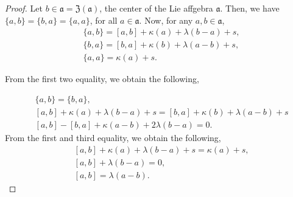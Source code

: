 \documentclass[10pt,a4paper]{amsart}
\begin{document}
\begin{proof}
    Let $b\in \mathfrak{a} = \mathfrak{Z(a)}$, the center of the Lie affgebra $\mathfrak{a}$. Then, we have $\{a, b\}=\{b,a\}=\{a, a\}$, for all $a\in \mathfrak{a}$. Now, for any $a, b\in \mathfrak{a}$,
    \begin{align*}
        &\{a,b\}=[a, b]+\kappa(a)+\lambda(b-a)+s,\\
         &\{b,a\}=[b, a]+\kappa(b)+\lambda(a-b)+s,\\
         &\{a,a\}=\kappa(a)+s.
    \end{align*}
    
From the first two equality, we obtain the following,

\begin{align}
&\{a, b\}=\{b,a\},\nonumber\\
&[a, b]+\kappa(a)+\lambda(b-a)+s=[b, a]+\kappa(b)+\lambda(a-b)+s\nonumber\\
&[a, b]-[b,a]+\kappa(a-b)+2\lambda(b-a)=0.
\end{align}
From the first and third equality, we obtain the following,
\begin{align}
&[a, b]+\kappa(a)+\lambda(b-a)+s=\kappa(a)+s,\nonumber\\
&[a, b]+\lambda(b-a)=0,\nonumber\\ \label{equ13}
&[a, b]=\lambda(a-b).
\end{align}


\end{proof}
\end{document}
